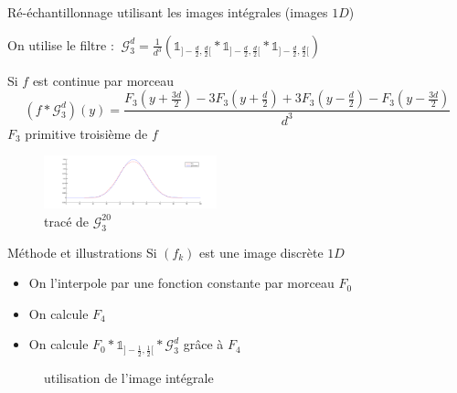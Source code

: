 \documentclass[c,12pt]{beamer}
\begin{document}
\begin{frame}{Ré-échantillonnage utilisant les images intégrales (images $1D$)}
\small{
On utilise le filtre :
$~
\mathcal{G}_3^d= \frac{1}{d^3}(\mathds{1}_{]-\frac{d}{2},\frac{d}{2}[} * \mathds{1}_{]-\frac{d}{2},\frac{d}{2}[} * \mathds{1}_{]-\frac{d}{2},\frac{d}{2}[})
$
\begin{block}{Si $f$ est continue par morceau}
\begin{equation*}
(f*\mathcal{G}_3^d)(y)=\frac{F_3(y+\frac{3d}{2})-3F_3(y+\frac{d}{2})+3F_3(y-\frac{d}{2})-F_3(y-\frac{3d}{2})}{d^3}
\end{equation*}
$F_3$ primitive troisième de $f$
\end{block}}
\begin{figure}
\centering
\includegraphics[width=5cm]{filtre_g3.png}
\caption{tracé de $\mathcal{G}_3^{20}$}
\end{figure}
\end{frame}
\begin{frame}{Méthode et illustrations}
Si $(f_k)$ est une image discrète $1D$ 
\begin{itemize}
\item On l'interpole par une fonction constante par morceau $F_0$
\item On calcule $F_4$   
\item On calcule $F_0 *\mathds{1}_{]-\frac{1}{2},\frac{1}{2}[}*\mathcal{G}_3^d$ grâce à $F_4$
\end{itemize}
\begin{figure}
\centering
{}
\caption{utilisation de l'image intégrale}
\end{figure}
\end{frame}
\end{document}
